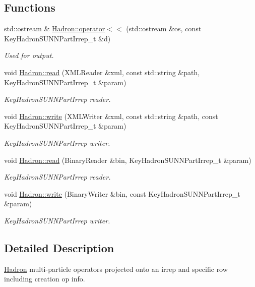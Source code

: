 \subsection*{Functions}
\begin{DoxyCompactItemize}
\item 
std\+::ostream \& \mbox{\hyperlink{namespaceHadron_a684b751246f1b7f63d5feafa97160408}{Hadron\+::operator$<$$<$}} (std\+::ostream \&os, const Key\+Hadron\+S\+U\+N\+N\+Part\+Irrep\+\_\+t \&d)
\begin{DoxyCompactList}\small\item\em Used for output. \end{DoxyCompactList}\item 
void \mbox{\hyperlink{namespaceHadron_a4cc74936761dd0dad429189f523b1432}{Hadron\+::read}} (X\+M\+L\+Reader \&xml, const std\+::string \&path, Key\+Hadron\+S\+U\+N\+N\+Part\+Irrep\+\_\+t \&param)
\begin{DoxyCompactList}\small\item\em Key\+Hadron\+S\+U\+N\+N\+Part\+Irrep reader. \end{DoxyCompactList}\item 
void \mbox{\hyperlink{namespaceHadron_a4d280edd65eda86698eae0d619c81a47}{Hadron\+::write}} (X\+M\+L\+Writer \&xml, const std\+::string \&path, const Key\+Hadron\+S\+U\+N\+N\+Part\+Irrep\+\_\+t \&param)
\begin{DoxyCompactList}\small\item\em Key\+Hadron\+S\+U\+N\+N\+Part\+Irrep writer. \end{DoxyCompactList}\item 
void \mbox{\hyperlink{namespaceHadron_a067d20ab6ec9071306d6db3a7e7cb4fd}{Hadron\+::read}} (Binary\+Reader \&bin, Key\+Hadron\+S\+U\+N\+N\+Part\+Irrep\+\_\+t \&param)
\begin{DoxyCompactList}\small\item\em Key\+Hadron\+S\+U\+N\+N\+Part\+Irrep reader. \end{DoxyCompactList}\item 
void \mbox{\hyperlink{namespaceHadron_a5a34021fb508d068cf35d125eef2e1b4}{Hadron\+::write}} (Binary\+Writer \&bin, const Key\+Hadron\+S\+U\+N\+N\+Part\+Irrep\+\_\+t \&param)
\begin{DoxyCompactList}\small\item\em Key\+Hadron\+S\+U\+N\+N\+Part\+Irrep writer. \end{DoxyCompactList}\end{DoxyCompactItemize}


\subsection{Detailed Description}
\mbox{\hyperlink{namespaceHadron}{Hadron}} multi-\/particle operators projected onto an irrep and specific row including creation op info. 


